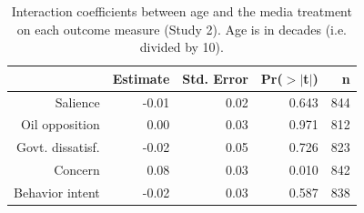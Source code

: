 \begin{table}[ht]
\centering
\caption{Interaction coefficients between age and the media
             treatment on each outcome measure (Study 2). Age is in decades
             (i.e. divided by 10).} 
\label{tab:disruption_byage2}
\begin{tabular}{rrrrr}
  \hline
 & Estimate & Std. Error & Pr($>$$|$t$|$) & n \\ 
  \hline
Salience & -0.01 & 0.02 & 0.643 & 844 \\ 
  Oil opposition & 0.00 & 0.03 & 0.971 & 812 \\ 
  Govt. dissatisf. & -0.02 & 0.05 & 0.726 & 823 \\ 
  Concern & 0.08 & 0.03 & 0.010 & 842 \\ 
  Behavior intent & -0.02 & 0.03 & 0.587 & 838 \\ 
   \hline
\end{tabular}
\end{table}
